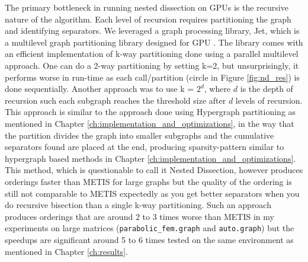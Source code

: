 The primary bottleneck in running nested dissection on GPUs is the recursive nature of the algorithm. Each level of recursion requires partitioning the graph and identifying separators. We leveraged a graph processing library, Jet, which is a multilevel graph partitioning library designed for GPU \cite{gilbert_jet_2024}. The library comes with an efficient implementation of k-way partitioning done using a parallel multilevel approach. One can do a 2-way partitioning by setting k=2, but unsurprisingly, it performs worse in run-time as each call/partition (circle in Figure \ref{fig:nd_res}) is done sequentially. Another approach was to use k = $2^d$, where $d$ is the depth of recursion such each subgraph reaches the threshold size after $d$ levels of recursion. This approach is similar to the approach done using Hypergraph partitioning as mentioned in Chapter \ref{ch:implementation_and_optimizations}, in the way that the partition
divides the graph into smaller subgraphs and the cumulative separators found are placed at the end, producing sparsity-pattern similar to hypergraph based methods in Chapter \ref{ch:implementation_and_optimizations}. This method, which is questionable to call it Nested Dissection, however produces orderings faster than METIS for large graphs but the quality of the ordering is still not comparable to METIS expectedly as you get better separators when you do recursive bisection than a single k-way partitioning. Such an approach produces orderings that are around 2 to 3 times worse than METIS in my experiments on large matrices (\texttt{parabolic_fem.graph} and \texttt{auto.graph}) but the speedups are significant around 5 to 6 times tested on the same environment as mentioned in Chapter \ref{ch:results}.
